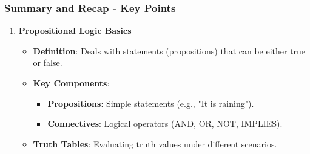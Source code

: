 \documentclass[aspectratio=169]{beamer}
\begin{document}
\begin{frame}[fragile]
    \frametitle{Summary and Recap - Key Points}
    \begin{enumerate}
        \item \textbf{Propositional Logic Basics}
        \begin{itemize}
            \item \textbf{Definition}: Deals with statements (propositions) that can be either true or false.
            \item \textbf{Key Components}:
            \begin{itemize}
                \item \textbf{Propositions}: Simple statements (e.g., "It is raining").
                \item \textbf{Connectives}: Logical operators (AND, OR, NOT, IMPLIES).
            \end{itemize}
            \item \textbf{Truth Tables}: Evaluating truth values under different scenarios.
        \end{itemize}
    \end{enumerate}
\end{frame}
\end{document}
